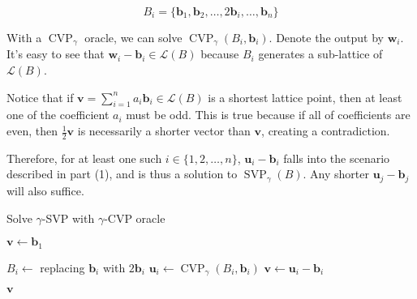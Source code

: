 \documentclass{article}
\begin{document}
$$
B_i = \{
    \mathbf{b}_1, \mathbf{b}_2, \ldots, 2 \mathbf{b}_i, \ldots, \mathbf{b}_n
\}
$$

With a $\operatorname{CVP}_\gamma$ oracle, we can solve $\operatorname{CVP}_\gamma(B_i, \mathbf{b}_i)$. Denote the output by $\mathbf{w}_i$. It's easy to see that $\mathbf{w}_i - \mathbf{b}_i \in \mathcal{L}(B)$ because $B_i$ generates a sub-lattice of $\mathcal{L}(B)$.

Notice that if $\mathbf{v} = \sum_{i=1}^n a_i\mathbf{b}_i \in \mathcal{L}(B)$ is a shortest lattice point, then at least one of the coefficient $a_i$ must be odd. This is true because if all of coefficients are even, then $\frac{1}{2}\mathbf{v}$ is necessarily a shorter vector than $\mathbf{v}$, creating a contradiction.

Therefore, for at least one such $i \in \{1, 2, \ldots, n\}$, $\mathbf{u}_i - \mathbf{b}_i$ falls into the scenario described in part (1), and is thus a solution to $\operatorname{SVP}_\gamma(B)$. Any shorter $\mathbf{u}_j - \mathbf{b}_j$ will also suffice.

\begin{algorithm}
\caption{Solve $\gamma$-SVP with $\gamma$-CVP oracle}\label{alg:cap}
\begin{algorithmic}
\State $\mathbf{v} \leftarrow \mathbf{b}_1$ 

    \State $B_i \leftarrow $ replacing $\mathbf{b}_i$ with $2\mathbf{b}_i$
    \State $\mathbf{u}_i \leftarrow \operatorname{CVP}_\gamma(B_i, \mathbf{b}_i)$
        \State $\mathbf{v} \leftarrow \mathbf{u}_i - \mathbf{b}_i$
    \EndIf
\EndFor

\Return $\mathbf{v}$

\end{algorithmic}
\end{algorithm}
\end{document}
